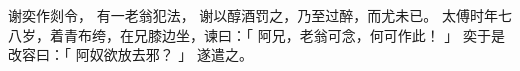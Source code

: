 
\switchcolumn*[\section{}]

谢奕作剡令，
有一老翁犯法，
谢以醇酒罚之，乃至过醉，而尤未已。
太傅时年七八岁，着青布绔，在兄膝边坐，谏曰：「
    阿兄，老翁可念，何可作此！
」
奕于是改容曰：「
    阿奴欲放去邪？
」
遂遣之。

\switchcolumn


